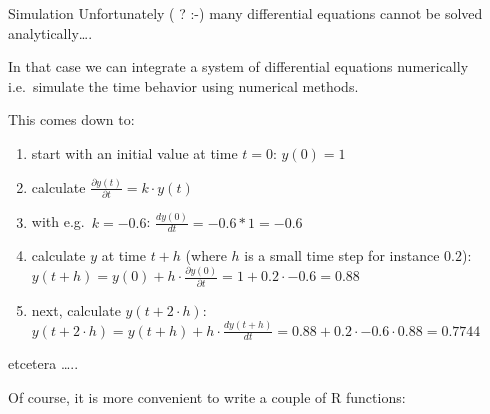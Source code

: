\documentclass[
  ignorenonframetext,
]{beamer}
\providecommand{\tightlist}{%
  \setlength{\itemsep}{0pt}\setlength{\parskip}{0pt}}
\begin{document}
\begin{frame}[fragile]{Simulation}
\protect\hypertarget{simulation}{}
Unfortunately ( ? :-) many differential equations cannot be solved
analytically\ldots.

In that case we can integrate a system of differential equations
numerically i.e.~simulate the time behavior using numerical methods.

This comes down to:

\begin{enumerate}
\tightlist
\item
  start with an initial value at time \(t=0\): \(y(0) = 1\)
\item
  calculate \(\frac{\partial y(t)}{\partial t} = k \cdot y(t)\)
\item
  with e.g.~\(k = -0.6\): \(\frac{dy(0)}{dt} = -0.6 * 1 = -0.6\)
\item
  calculate \(y\) at time \(t+h\) (where \(h\) is a small time step for
  instance \(0.2\)):
  \(y(t+h) = y(0)+ h \cdot \frac{\partial y(0)}{\partial t} = 1 + 0.2 \cdot -0.6 = 0.88\)
\item
  next, calculate \(y(t+2\cdot h)\):\\
  \(y(t+2\cdot h) = y(t+h) + h \cdot \frac{dy(t+h)}{dt} = 0.88 + 0.2 \cdot -0.6 \cdot 0.88 = 0.7744\)
\end{enumerate}

etcetera \ldots..

Of course, it is more convenient to write a couple of R functions:


\end{frame}
\end{document}
